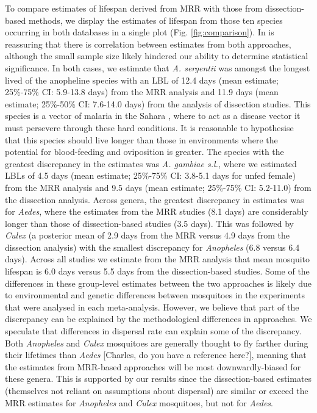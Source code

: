 \documentclass[]{article}
\begin{document}
To compare estimates of lifespan derived from MRR with those from
dissection-based methods, we display the estimates of lifespan from
those ten species occurring in both databases in a single plot (Fig. \ref{fig:comparison}). In is reassuring that there is correlation between estimates from both approaches, although the small sample size likely hindered our ability
to determine statistical significance. In both cases, we estimate that
\emph{A. sergentii} was amongst the longest lived of the anopheline
species with an LBL of 12.4 days (mean estimate;
25\%-75\% CI: 5.9-13.8 days) from the MRR analysis and 11.9 days (mean
estimate; 25\%-50\% CI: 7.6-14.0 days) from the analysis of dissection
studies. This species is a vector of malaria in the Sahara \citep{sinka2010dominant}, where to act as a disease vector it must persevere
through these hard conditions. It is reasonable to hypothesise that this
species should live longer than those in environments where the
potential for blood-feeding and oviposition is greater. The species with
the greatest discrepancy in the estimates was \emph{A. gambiae s.l.}, where we estimated LBLs of 4.5 days
(mean estimate; 25\%-75\% CI: 3.8-5.1 days for unfed female) from the
MRR analysis and 9.5 days (mean estimate; 25\%-75\% CI: 5.2-11.0) from
the dissection analysis. Across genera, the greatest discrepancy in estimates was for
\emph{Aedes}, where the estimates from the MRR studies (8.1 days) are considerably longer than those of dissection-based studies (3.5 days).
This was followed by \emph{Culex} (a posterior mean of 2.9 days from the
MRR versus 4.9 days from the dissection analysis) with the smallest
discrepancy for \emph{Anopheles} (6.8 versus 6.4 days). Across all studies we estimate
from the MRR analysis that mean mosquito lifespan is 6.0 days versus 5.5
days from the dissection-based studies. Some of the differences in these
group-level estimates between the two approaches is likely due to
environmental and genetic differences between mosquitoes in the
experiments that were analysed in each meta-analysis. However, we
believe that part of the discrepancy can be explained by the
methodological differences in approaches. We speculate that differences
in dispersal rate can explain some of the discrepancy. Both
\emph{Anopheles} and \emph{Culex} mosquitoes are generally thought to
fly farther during their lifetimes than \emph{Aedes} {[}Charles, do you
have a reference here?{]}, meaning that the estimates from MRR-based
approaches will be most downwardly-biased for these genera. This is
supported by our results since the dissection-based estimates
(themselves not reliant on assumptions about dispersal) are similar or exceed the MRR
estimates for \emph{Anopheles} and \emph{Culex} mosquitoes, but not for
\emph{Aedes}.
\end{document}
